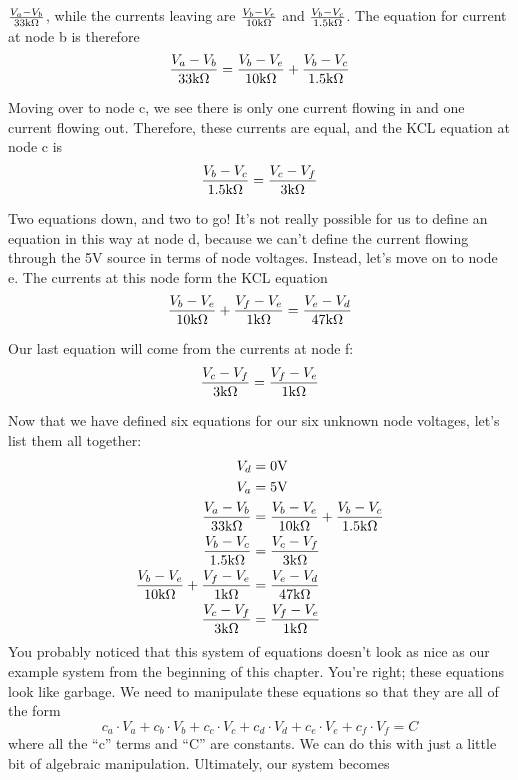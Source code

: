 $\frac{V_a-V_b}{33\textnormal{k}\Omega}$, while the currents leaving are $\frac{V_b-V_e}{10\textnormal{k}\Omega}$ and $\frac{V_b-V_c}{1.5\textnormal{k}\Omega}$. The equation for current at node b is therefore
$$
\frac{V_a-V_b}{33\textnormal{k}\Omega} = \frac{V_b-V_e}{10\textnormal{k}\Omega} + \frac{V_b-V_c}{1.5\textnormal{k}\Omega}
$$
\par
Moving over to node c, we see there is only one current flowing in and one current flowing out. Therefore, these currents are equal, and the KCL equation at node c is
$$
\frac{V_b-V_c}{1.5\textnormal{k}\Omega}=\frac{V_c-V_f}{3\textnormal{k}\Omega}
$$
\par
Two equations down, and two to go! It's not really possible for us to define an equation in this way at node d, because we can't define the current flowing through the 5V source in terms of node voltages. Instead, let's move on to node e. The currents at this node form the KCL equation
$$
\frac{V_b-V_e}{10\textnormal{k}\Omega} + \frac{V_f-V_e}{1\textnormal{k}\Omega} = \frac{V_e-V_d}{47\textnormal{k}\Omega}
$$
\par
Our last equation will come from the currents at node f:
$$
\frac{V_c-V_f}{3\textnormal{k}\Omega}=\frac{V_f-V_e}{1\textnormal{k}\Omega}
$$
\par
Now that we have defined six equations for our six unknown node voltages, let's list them all together:
\begin{align*}
V_d&=0\textnormal{V} \\
V_a&=5\textnormal{V}
\\
\frac{V_a-V_b}{33\textnormal{k}\Omega} &= \frac{V_b-V_e}{10\textnormal{k}\Omega} + \frac{V_b-V_c}{1.5\textnormal{k}\Omega}
\\
\frac{V_b-V_c}{1.5\textnormal{k}\Omega}&=\frac{V_c-V_f}{3\textnormal{k}\Omega}
\\
\frac{V_b-V_e}{10\textnormal{k}\Omega} + \frac{V_f-V_e}{1\textnormal{k}\Omega} &= \frac{V_e-V_d}{47\textnormal{k}\Omega}
\\
\frac{V_c-V_f}{3\textnormal{k}\Omega}&=\frac{V_f-V_e}{1\textnormal{k}\Omega}
\end{align*}
You probably noticed that this system of equations doesn't look as nice as our example system from the beginning of this chapter. You're right; these equations look like garbage. We need to manipulate these equations so that they are all of the form 
$$
c_a\cdot V_a + c_b\cdot V_b + c_c\cdot V_c + c_d\cdot V_d + c_e\cdot V_e + c_f\cdot V_f = C
$$
where all the ``c'' terms and ``C'' are constants. We can do this with just a little bit of algebraic manipulation. Ultimately, our system becomes
